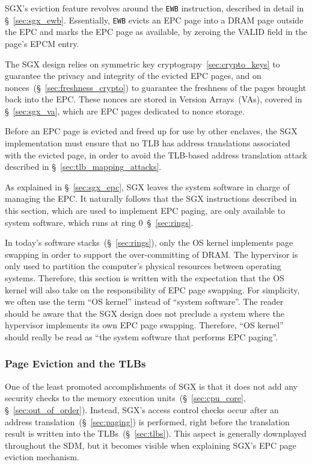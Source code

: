 SGX's eviction feature revolves around the \texttt{EWB} instruction, described
in detail in \S~\ref{sec:sgx_ewb}. Essentially, \texttt{EWB} evicts an EPC page
into a DRAM page outside the EPC and marks the EPC page as available, by
zeroing the VALID field in the page's EPCM entry.

The SGX design relies on symmetric key cryptograpy~\ref{sec:crypto_keys} to
guarantee the privacy and integrity of the evicted EPC pages, and on
nonces~(\S~\ref{sec:freshness_crypto}) to guarantee the freshness of the pages
brought back into the EPC. These nonces are stored in Version Arrays~(VAs),
covered in \S~\ref{sec:sgx_va}, which are EPC pages dedicated to nonce storage.

Before an EPC page is evicted and freed up for use by other enclaves, the SGX
implementation must ensure that no TLB has address translations associated with
the evicted page, in order to avoid the TLB-based address translation attack
described in \S~\ref{sec:tlb_mapping_attacks}.

As explained in \S~\ref{sec:sgx_epc}, SGX leaves the system software in charge
of managing the EPC. It naturally follows that the SGX instructions described
in this section, which are used to implement EPC paging, are only available to
system software, which runs at ring 0~\S~\ref{sec:rings}.

In today's software stacks~(\S~\ref{sec:rings}), only the OS kernel implements
page swapping in order to support the over-committing of DRAM. The hypervisor
is only used to partition the computer's physical resources between operating
systems. Therefore, this section is written with the expectation that the OS
kernel will also take on the responsibility of EPC page swapping. For
simplicity, we often use the term ``OS kernel'' instead of ``system software''.
The reader should be aware that the SGX design does not preclude a system where
the hypervisor implements its own EPC page swapping. Therefore, ``OS kernel''
should really be read as ``the system software that performs EPC paging''.


\subsubsection{Page Eviction and the TLBs}
\label{sec:sgx_eblock}

One of the least promoted accomplishments of SGX is that it does not add any
security checks to the memory execution units~(\S~\ref{sec:cpu_core},
\S~\ref{sec:out_of_order}). Instead, SGX's access control checks occur after an
address translation~(\S~\ref{sec:paging}) is performed, right before the
translation result is written into the TLBs~(\S~\ref{sec:tlbs}). This aspect
is generally downplayed throughout the SDM, but it becomes visible when
explaining SGX's EPC page eviction mechanism.

